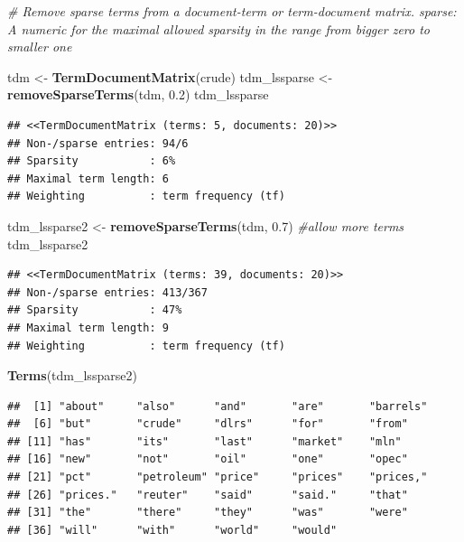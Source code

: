 \documentclass[]{book}
\newenvironment{Shaded}{\begin{snugshade}}{\end{snugshade}}
\newcommand{\KeywordTok}[1]{\textcolor[rgb]{0.13,0.29,0.53}{\textbf{{#1}}}}
\newcommand{\FloatTok}[1]{\textcolor[rgb]{0.00,0.00,0.81}{{#1}}}
\newcommand{\StringTok}[1]{\textcolor[rgb]{0.31,0.60,0.02}{{#1}}}
\newcommand{\CommentTok}[1]{\textcolor[rgb]{0.56,0.35,0.01}{\textit{{#1}}}}
\newcommand{\NormalTok}[1]{{#1}}
\begin{document}
\begin{Shaded}
\begin{Highlighting}[]
\CommentTok{# Remove sparse terms from a document-term or term-document matrix. sparse: A numeric for the maximal allowed sparsity in the range from bigger zero to smaller one}

\NormalTok{tdm <-}\StringTok{ }\KeywordTok{TermDocumentMatrix}\NormalTok{(crude)}
\NormalTok{tdm_lssparse <-}\StringTok{ }\KeywordTok{removeSparseTerms}\NormalTok{(tdm, }\FloatTok{0.2}\NormalTok{) }
\NormalTok{tdm_lssparse}
\end{Highlighting}
\end{Shaded}

\begin{verbatim}
## <<TermDocumentMatrix (terms: 5, documents: 20)>>
## Non-/sparse entries: 94/6
## Sparsity           : 6%
## Maximal term length: 6
## Weighting          : term frequency (tf)
\end{verbatim}

\begin{Shaded}
\begin{Highlighting}[]
\NormalTok{tdm_lssparse2 <-}\StringTok{ }\KeywordTok{removeSparseTerms}\NormalTok{(tdm, }\FloatTok{0.7}\NormalTok{) }\CommentTok{#allow more terms}
\NormalTok{tdm_lssparse2}
\end{Highlighting}
\end{Shaded}

\begin{verbatim}
## <<TermDocumentMatrix (terms: 39, documents: 20)>>
## Non-/sparse entries: 413/367
## Sparsity           : 47%
## Maximal term length: 9
## Weighting          : term frequency (tf)
\end{verbatim}

\begin{Shaded}
\begin{Highlighting}[]
\KeywordTok{Terms}\NormalTok{(tdm_lssparse2)}
\end{Highlighting}
\end{Shaded}

\begin{verbatim}
##  [1] "about"     "also"      "and"       "are"       "barrels"  
##  [6] "but"       "crude"     "dlrs"      "for"       "from"     
## [11] "has"       "its"       "last"      "market"    "mln"      
## [16] "new"       "not"       "oil"       "one"       "opec"     
## [21] "pct"       "petroleum" "price"     "prices"    "prices,"  
## [26] "prices."   "reuter"    "said"      "said."     "that"     
## [31] "the"       "there"     "they"      "was"       "were"     
## [36] "will"      "with"      "world"     "would"
\end{verbatim}
\end{document}
